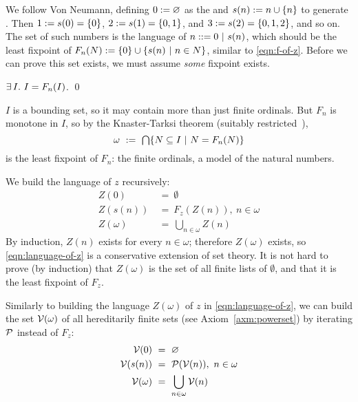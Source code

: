 We follow Von Neumann, defining $0 := \varnothing$ as the  and $s(n) := n \cup \{{n}\}$ to generate . Then $1 := s(0) = \{{0}\}$, $2 := s(1) = \{{0,1}\}$, and $3 := s(2) = \{{0,1,2}\}$, and so on. The set of such numbers is the language of $n ::= 0 \ |\  s(n)$, which should be the least fixpoint of $F_n(N) := \{{0}\} \cup \lbrace {s(n)} \ \lvert\ {n \in N} \rbrace$, similar to \eqref{eqn:f-of-z}.
Before we can prove this set exists, we must assume \emph{some} fixpoint exists.
\begin{axiom}[infinity]
$\exists\,{I}\ldotp\, I = F_n(I)$.
\qed
\end{axiom}
$I$ is a bounding set, so it may contain more than just finite ordinals. But $F_n$ is monotone in $I$, so by the Knaster-Tarksi theorem (suitably restricted~\cite{cit:paulson-1995-settheory-ii}),
\begin{equation}
  \omega\ :=\ \textstyle\bigcap \lbrace {N \subseteq I} \ \lvert\ {N = F_n(N)} \rbrace
\end{equation}
is the least fixpoint of $F_n$: the finite ordinals, a model of the natural numbers.

\begin{example}
We build the language of $z$ recursively:
\begin{equation}
\begin{aligned}
	Z(0) &\ =\ \emptyset \\
	Z(s(n)) &\ =\ F_z(Z(n)),\ n \in \omega \\
	Z(\omega) &\ =\ \bigcup_{n \in \omega} Z(n)
\end{aligned}
\label{eqn:language-of-z}
\end{equation}
By induction, $Z(n)$ exists for every $n \in \omega$; therefore $Z(\omega)$ exists, so \eqref{eqn:language-of-z} is a conservative extension of set theory. It is not hard to prove (by induction) that $Z(\omega)$ is the set of all finite lists of $\emptyset$, and that it is the least fixpoint of $F_z$.
\exampleqed
\end{example}

Similarly to building the language $Z(\omega)$ of $z$ in \eqref{eqn:language-of-z}, we can build the set $\mathcal{V}(\omega)$ of all hereditarily finite sets (see Axiom~\ref{axm:powerset}) by iterating $\mathcal{P}$ instead of $F_z$:
\begin{equation}
\begin{aligned}
	\mathcal{V}(0) &\ =\ \varnothing \\
	\mathcal{V}(s(n)) &\ =\ \mathcal{P}(\mathcal{V}(n)),\ n \in \omega \\
	\mathcal{V}(\omega) &\ =\ \bigcup_{n \in \omega} \mathcal{V}(n)
\end{aligned}
\label{eqn:finite-sets}
\end{equation}

